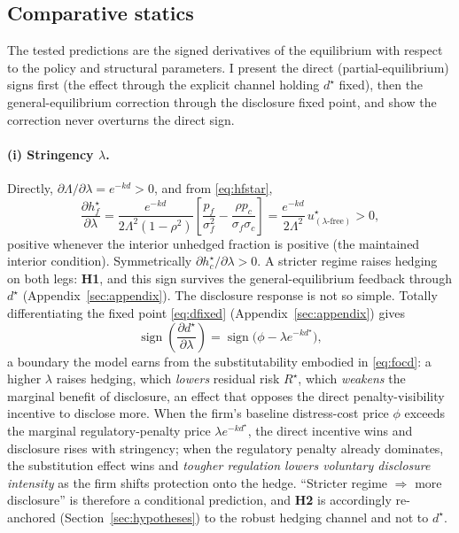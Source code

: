 \documentclass[11pt,a4paper]{article}
\begin{document}
\subsection{Comparative statics}
\label{sec:compstat}

The tested predictions are the signed derivatives of the equilibrium with respect to the policy and structural parameters. I present the direct (partial-equilibrium) signs first (the effect through the explicit channel holding $d^\star$ fixed), then the general-equilibrium correction through the disclosure fixed point, and show the correction never overturns the direct sign.

\paragraph{(i) Stringency $\lambda$.} Directly, $\partial\Lambda/\partial\lambda=e^{-kd}>0$, and from \eqref{eq:hfstar},
\begin{equation}
\frac{\partial h_f^\star}{\partial\lambda}=\frac{e^{-kd}}{2\Lambda^2(1-\rho^2)}\left[\frac{p_f}{\sigma_f^2}-\frac{\rho p_c}{\sigma_f\sigma_c}\right]=\frac{e^{-kd}}{2\Lambda^2}\,u^\star_{(\lambda\text{-free})}>0,
\label{eq:dhdlambda}
\end{equation}
positive whenever the interior unhedged fraction is positive (the maintained interior condition). Symmetrically $\partial h_c^\star/\partial\lambda>0$. A stricter regime raises hedging on both legs: \textbf{H1}, and this sign survives the general-equilibrium feedback through $d^\star$ (Appendix~\ref{sec:appendix}). The disclosure response is not so simple. Totally differentiating the fixed point \eqref{eq:dfixed} (Appendix~\ref{sec:appendix}) gives
\begin{equation}
\operatorname{sign}\!\left(\frac{\partial d^\star}{\partial\lambda}\right)=\operatorname{sign}\!\big(\phi-\lambda e^{-kd^\star}\big),
\label{eq:ddboundary}
\end{equation}
a boundary the model earns from the substitutability embodied in \eqref{eq:focd}: a higher $\lambda$ raises hedging, which \emph{lowers} residual risk $R^\star$, which \emph{weakens} the marginal benefit of disclosure, an effect that opposes the direct penalty-visibility incentive to disclose more. When the firm's baseline distress-cost price $\phi$ exceeds the marginal regulatory-penalty price $\lambda e^{-kd^\star}$, the direct incentive wins and disclosure rises with stringency; when the regulatory penalty already dominates, the substitution effect wins and \emph{tougher regulation lowers voluntary disclosure intensity} as the firm shifts protection onto the hedge. ``Stricter regime $\Rightarrow$ more disclosure'' is therefore a conditional prediction, and \textbf{H2} is accordingly re-anchored (Section~\ref{sec:hypotheses}) to the robust hedging channel and not to $d^\star$.
\end{document}
